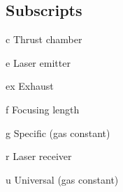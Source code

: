 \begin{multicols*}{2}
    \section*{Subscripts}
    \begin{nomlist}
        \item[c]   Thrust chamber
        \item[e]   Laser emitter
        \item[ex]  Exhaust
        \item[f]   Focusing length
        \item[g]   Specific (gas constant)
        \item[r]   Laser receiver
        \item[u]   Universal (gas constant)
    \end{nomlist}


\end{multicols*}